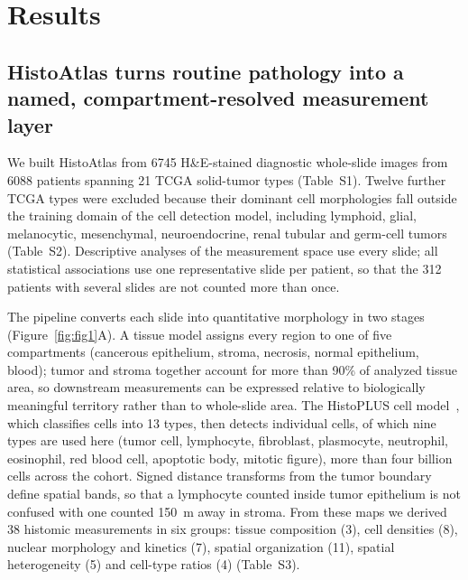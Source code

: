 \section{Results}
\label{sec:results}

\subsection{HistoAtlas turns routine pathology into a named, compartment-resolved measurement layer}
\label{sec:results:resource}

We built HistoAtlas from \num{6745} H\&E-stained diagnostic whole-slide images
from \num{6088} patients spanning 21 TCGA solid-tumor types
(Table~S1). Twelve further TCGA types were excluded because their dominant cell
morphologies fall outside the training domain of the cell detection model,
including lymphoid, glial, melanocytic, mesenchymal, neuroendocrine, renal
tubular and germ-cell tumors (Table~S2). Descriptive analyses of the measurement
space use every slide; all statistical associations use one representative slide
per patient, so that the 312 patients with several slides are not counted more
than once.

The pipeline converts each slide into quantitative morphology in two stages
(Figure~\ref{fig:fig1}A). A tissue model assigns every region to one of five
compartments (cancerous epithelium, stroma, necrosis, normal epithelium, blood);
tumor and stroma together account for more than 90\% of analyzed tissue area, so
downstream measurements can be expressed relative to biologically meaningful
territory rather than to whole-slide area. The HistoPLUS cell
model~\cite{adjadj2026histoplus}, which classifies cells into 13 types, then
detects individual cells, of which nine types are used here (tumor cell,
lymphocyte, fibroblast, plasmocyte, neutrophil, eosinophil, red blood cell,
apoptotic body, mitotic figure), more
than four billion cells across the cohort. Signed distance transforms from the
tumor boundary define spatial bands, so that a lymphocyte counted inside tumor
epithelium is not confused with one counted 150~\textmu m away in stroma. From
these maps we derived 38 histomic measurements in six groups: tissue composition
(3), cell densities (8), nuclear morphology and kinetics (7), spatial organization
(11), spatial heterogeneity (5) and cell-type ratios (4) (Table~S3).

